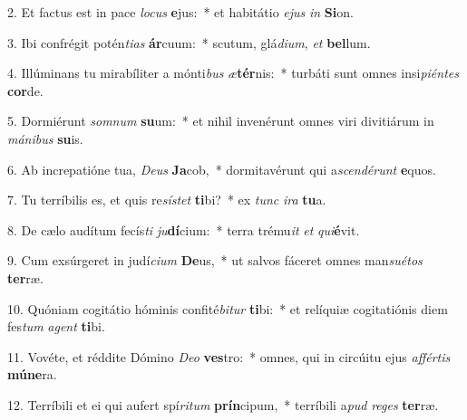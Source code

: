 2. Et factus est in pace \textit{lo}\textit{cus} \textbf{e}jus:~*  et habitátio \textit{e}\textit{jus} \textit{in} \textbf{Si}on.\

3. Ibi confrégit potén\textit{ti}\textit{as} \textbf{ár}cuum:~*  scutum, glá\textit{di}\textit{um}, \textit{et} \textbf{bel}lum.\

4. Illúminans tu mirabíliter a mónti\textit{bus} \textit{æ}\textbf{tér}nis:~*  turbáti sunt omnes insi\textit{pi}\textit{én}\textit{tes} \textbf{cor}de.\

5. Dormiérunt \textit{som}\textit{num} \textbf{su}um:~*  et nihil invenérunt omnes viri divitiárum in \textit{má}\textit{ni}\textit{bus} \textbf{su}is.\

6. Ab increpatióne tua, \textit{De}\textit{us} \textbf{Ja}cob,~*  dormitavérunt qui a\textit{scen}\textit{dé}\textit{runt} \textbf{e}quos.\

7. Tu terríbilis es, et quis re\textit{sís}\textit{tet} \textbf{ti}bi?~*  ex \textit{tunc} \textit{i}\textit{ra} \textbf{tu}a.\

8. De cælo audítum fecís\textit{ti} \textit{ju}\textbf{dí}cium:~*  terra trému\textit{it} \textit{et} \textit{qui}\textbf{é}vit.\

9. Cum exsúrgeret in judí\textit{ci}\textit{um} \textbf{De}us,~*  ut salvos fáceret omnes man\textit{su}\textit{é}\textit{tos} \textbf{ter}ræ.\

10. Quóniam cogitátio hóminis confité\textit{bi}\textit{tur} \textbf{ti}bi:~*  et relíquiæ cogitatiónis diem fes\textit{tum} \textit{a}\textit{gent} \textbf{ti}bi.\

11. Vovéte, et réddite Dómino \textit{De}\textit{o} \textbf{ves}tro:~*  omnes, qui in circúitu ejus \textit{af}\textit{fér}\textit{tis} \textbf{mú}\textbf{ne}ra.\

12. Terríbili et ei qui aufert spí\textit{ri}\textit{tum} \textbf{prín}cipum,~*  terríbili a\textit{pud} \textit{re}\textit{ges} \textbf{ter}ræ.\

